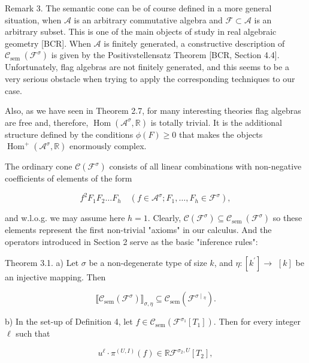 \documentclass[10pt]{article}
\begin{document}
Remark 3. The semantic cone can be of course defined in a more general situation, when $\mathcal{A}$ is an arbitrary commutative algebra and $\mathcal{F} \subset \mathcal{A}$ is an arbitrary subset. This is one of the main objects of study in real algebraic geometry [BCR]. When $\mathcal{A}$ is finitely generated, a constructive description of $\mathcal{C}_{\text {sem }}\left(\mathcal{F}^{\sigma}\right)$ is given by the Positivstellensatz Theorem [BCR, Section 4.4]. Unfortunately, flag algebras are not finitely generated, and this seems to be a very serious obstacle when trying to apply the corresponding techniques to our case.

Also, as we have seen in Theorem 2.7, for many interesting theories flag algebras are free and, therefore, $\operatorname{Hom}\left(\mathcal{A}^{\sigma}, \mathbb{R}\right)$ is totally trivial. It is the additional structure defined by the conditions $\phi(F) \geq 0$ that makes the objects $\operatorname{Hom}^{+}\left(\mathcal{A}^{\sigma}, \mathbb{R}\right)$ enormously complex.

The ordinary cone $\mathcal{C}\left(\mathcal{F}^{\sigma}\right)$ consists of all linear combinations with non-negative coefficients of elements of the form

$$
f^{2} F_{1} F_{2} \ldots F_{h} \quad\left(f \in \mathcal{A}^{\sigma} ; F_{1}, \ldots, F_{h} \in \mathcal{F}^{\sigma}\right),
$$

and w.l.o.g. we may assume here $h=1$. Clearly, $\mathcal{C}\left(\mathcal{F}^{\sigma}\right) \subseteq \mathcal{C}_{\text {sem }}\left(\mathcal{F}^{\sigma}\right)$ so these elements represent the first non-trivial "axioms" in our calculus. And the operators introduced in Section 2 serve as the basic "inference rules":

Theorem 3.1. a) Let $\sigma$ be a non-degenerate type of size $k$, and $\eta:\left[k^{\prime}\right] \longrightarrow$ $[k]$ be an injective mapping. Then

$$
\llbracket \mathcal{C}_{\mathrm{sem}}\left(\mathcal{F}^{\sigma}\right) \rrbracket_{\sigma, \eta} \subseteq \mathcal{C}_{\mathrm{sem}}\left(\mathcal{F}^{\sigma \mid{ }_{\eta}}\right) .
$$

b) In the set-up of Definition 4, let $f \in \mathcal{C}_{\operatorname{sem}}\left(\mathcal{F}^{\sigma_{1}}\left[T_{1}\right]\right)$. Then for every integer $\ell$ such that


\begin{equation*}
u^{\ell} \cdot \pi^{(U, I)}(f) \in \mathbb{R} \mathcal{F}^{\sigma_{2}, U}\left[T_{2}\right], \tag{12}
\end{equation*}
\end{document}
